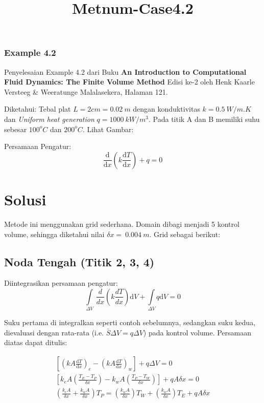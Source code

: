 \documentclass[11pt]{article}
\title{Metnum-Case4.2}
\begin{document}
    
    
    \maketitle
    
    

    
    \subsubsection{Example 4.2}\label{example-4.2}

Penyelesaian Example 4.2 dari Buku \textbf{An Introduction to
Computational Fluid Dynamics: The Finite Volume Method} Edisi ke-2 oleh
Henk Kaarle Versteeg \& Weeratunge Malalasekera, Halaman 121.

Diketahui: Tebal plat \(L = 2 cm = 0.02\ m\) dengan konduktivitas
\(k = 0.5\ W/m.K\) dan \emph{Uniform heat generation}
\(q = 1000\ kW/m^{3}\). Pada titik A dan B memiliki suhu sebesar
\(100^{o}C\) dan \(200^{o}C\). Lihat Gambar:

Persamaan Pengatur:
\[\frac{\mathrm{d}}{\mathrm{d}x} \left( k\frac{\mathrm{d}T}{\mathrm{d}x} \right) + q = 0\]

    \section{Solusi}\label{solusi}

Metode ini menggunakan grid sederhana. Domain dibagi menjadi 5 kontrol
volume, sehingga diketahui nilai \(\delta x =\ 0.004\ m\). Grid sebagai
berikut:

\subsection{Noda Tengah (Titik 2, 3, 4)}\label{noda-tengah-titik-2-3-4}

Diintegrasikan persamaan pengatur:
\[ \int\limits_{\Delta V}\ \frac{d}{dx} \left( k\frac{dT}{dx} \right) \text{d}V + \int\limits_{\Delta V} q \text{d}V = 0\]

Suku pertama di integralkan seperti contoh sebelumnya, sedangkan suku
kedua, dievaluasi dengan rata-rata (i.e. \(\bar{S}\Delta V=q\Delta V\))
pada kontrol volume. Persamaan diatas dapat ditulis:

\[\begin{aligned}
\left[ \left( k A \frac{\text{d}T}{\text{d}x} \right)_e -
\left( k A \frac{\text{d}T}{\text{d}x} \right)_w \right] 
+q \Delta V = 0 \\
\left[ k_e A \left(\frac{T_E-T_P}{\delta x} \right) - k_w A \left(\frac{T_P-T_W}{\delta x} \right) \right]
+ q A \delta x = 0 \\
\left(\frac{k_e A}{\delta x} + \frac{k_w A}{\delta x}\right)T_P = \left(\frac{k_w A}{\delta x}\right)T_W +
\left(\frac{k_w A}{\delta x} \right)T_E + q A \delta x \\
\end{aligned}\]
\end{document}
